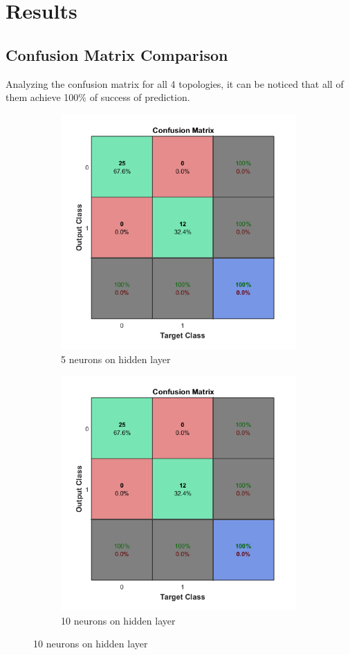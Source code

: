 \documentclass[12pt]{article}
\begin{document}
\section{Results}
	\subsection{Confusion Matrix Comparison}
	Analyzing the confusion matrix for all 4 topologies, it can be noticed that all of them achieve 100\% of success of prediction.

	\begin{figure}[H]
	\centering
	\begin{subfigure}{9cm}
	\centering\includegraphics[width=9cm]{images/conf5_1.png}
	\caption{5 neurons on hidden layer}
	\end{subfigure}%
	\begin{subfigure}{9cm}
	\centering\includegraphics[width=9cm]{images/conf10_1.png}
	\caption{10 neurons on hidden layer}
	\end{subfigure}\vspace{10pt}
	 

\end{figure}
\end{document}
